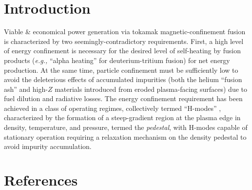 \documentclass[12pt]{iopart}
\newcommand{\eg}{\emph{e.g., }}
\begin{document}
\section{Introduction}\label{sec:intro}

Viable \& economical power generation via tokamak magnetic-confinement fusion is characterized by two seemingly-contradictory requirements.
First, a high level of energy confinement is necessary for the desired level of self-heating by fusion products (\eg ``alpha heating'' for deuterium-tritium fusion) for net energy production.  
At the same time, particle confinement must be sufficiently low to avoid the deleterious effects of accumulated impurities (both the helium ``fusion ash'' and high-$Z$ materials introduced from eroded plasma-facing surfaces) due to fuel dilution and radiative losses.
The energy confinement requirement has been achieved in a class of operating regimes, collectively termed ``H-modes'' \cite{Wagner1982}, characterized by the formation of a steep-gradient region at the plasma edge in density, temperature, and pressure, termed the \emph{pedestal}, with H-modes capable of stationary operation requiring a relaxation mechanism on the density pedestal to avoid impurity accumulation.

\section*{References}


\end{document}
